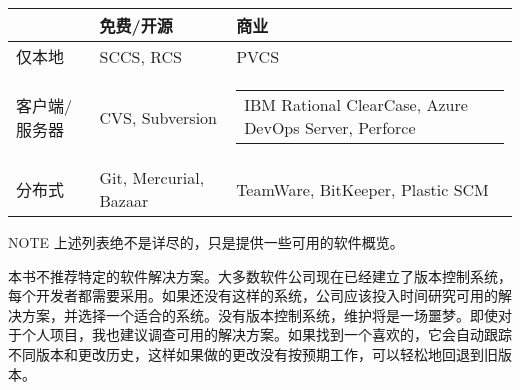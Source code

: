 \begin{longtable}{|l|l|l|}
\hline
\textbf{}   & \textbf{免费/开源} & \textbf{商业}              \\ \hline
\endfirsthead
%
\endhead
%
仅本地  & SCCS, RCS                 & PVCS                             \\ \hline
客户端/服务器 & CVS, Subversion & \begin{tabular}[c]{@{}l@{}}IBM Rational ClearCase, Azure DevOps Server, Perforce\end{tabular} \\ \hline
分布式 & Git, Mercurial, Bazaar    & TeamWare, BitKeeper, Plastic SCM \\ \hline
\end{longtable}

\begin{myNotic}{NOTE}
上述列表绝不是详尽的，只是提供一些可用的软件概览。
\end{myNotic}

本书不推荐特定的软件解决方案。大多数软件公司现在已经建立了版本控制系统，每个开发者都需要采用。如果还没有这样的系统，公司应该投入时间研究可用的解决方案，并选择一个适合的系统。没有版本控制系统，维护将是一场噩梦。即使对于个人项目，我也建议调查可用的解决方案。如果找到一个喜欢的，它会自动跟踪不同版本和更改历史，这样如果做的更改没有按预期工作，可以轻松地回退到旧版本。











